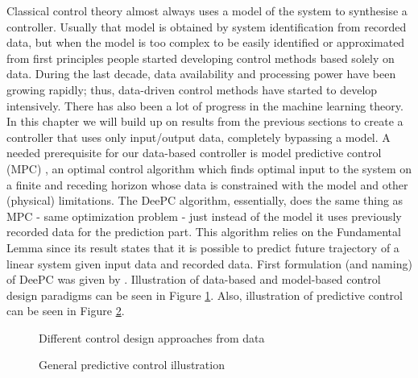 \documentclass[12pt,a4paper]{report}
\begin{document}
Classical control theory almost always uses a model of the system to synthesise a controller. Usually that model is obtained by system identification from recorded data, but when the model
is too complex to be easily identified or approximated from first principles people started developing control methods based solely on data.
During the last decade, data availability and processing power have been growing rapidly; thus, data-driven control methods have started to develop intensively. There has also been a lot of progress in the machine learning theory. In this chapter we will build up on
results from the previous sections to create a controller that uses only input/output data, completely bypassing a model. A needed prerequisite for our data-based controller is model predictive control (MPC) \cite{rawlings2017mpc},
an optimal control algorithm which finds optimal input to the system on a finite and receding horizon whose data is constrained with the model and other (physical) limitations.
The DeePC algorithm, essentially, does the same thing as MPC - same optimization problem - just instead of the model it uses previously recorded data for the prediction part. This
algorithm relies on the Fundamental Lemma since its result states that it is possible to predict future trajectory of a linear system given input data and recorded data. First formulation (and naming)
of DeePC was given by \cite{coulson2019data}.
Illustration of data-based and model-based control design paradigms can be seen in Figure \ref{fig:data-based-vs-model}. Also, illustration of predictive control can be seen in Figure \ref{fig:pred-control}.

\begin{figure}[htbp]
    \centering
    \resizebox{0.7\textwidth}{!}{
        
    }
    \caption{Different control design approaches from data}
    \label{fig:data-based-vs-model}
\end{figure}

\begin{figure}[htbp]
    \centering
    \resizebox{0.7\textwidth}{!}{
    
    }
    \caption{General predictive control illustration}
    \label{fig:pred-control}
\end{figure}

\newpage
\end{document}
